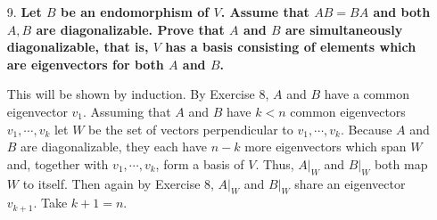 \documentclass[12pt]{article}
\begin{document}
\begin{enumerate}
    \item[9.]
        \boldmath\textbf{Let $B$ be an endomorphism of $V$. Assume that $AB = BA$ and both $A, B$ are diagonalizable. Prove that $A$ and $B$ are simultaneously diagonalizable, that is, $V$ has a basis consisting of elements which are eigenvectors for both $A$ and $B$.
        }\unboldmath \par
        This will be shown by induction. By Exercise 8, $A$ and $B$ have a common eigenvector $v_1$. Assuming that $A$ and $B$ have $k < n$ common eigenvectors $v_1, \cdots, v_k$ let $W$ be the set of vectors perpendicular to $v_1, \cdots, v_k$. Because $A$ and $B$ are diagonalizable, they each have $n - k$ more eigenvectors which span $W$ and, together with $v_1, \cdots, v_k$, form a basis of $V$. Thus, $A|_W$ and $B|_W$ both map $W$ to itself. Then again by Exercise 8, $A|_W$ and $B|_W$ share an eigenvector $v_{k + 1}$. Take $k + 1 = n$.


\end{enumerate}
\end{document}

